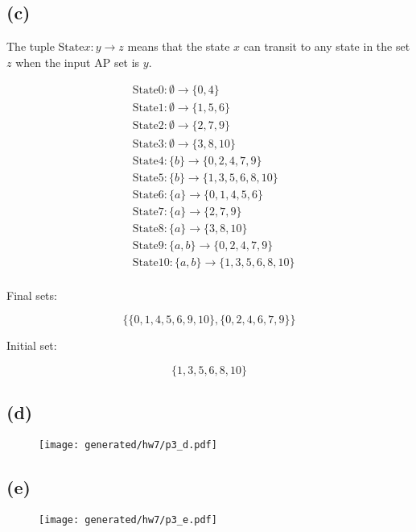 \subsection*{(c)}

The tuple $\text{State} x: y \rightarrow z$ means that the state $x$ can transit to any state in the set $z$ when the input AP set is $y$.

$$
\begin{aligned}
& \text{State} 0: \emptyset \to \{ 0, 4 \} \\
& \text{State} 1: \emptyset \to \{ 1, 5, 6 \} \\
& \text{State} 2: \emptyset \to \{ 2, 7, 9 \} \\
& \text{State} 3: \emptyset \to \{ 3, 8, 10 \} \\
& \text{State} 4: \{ b \} \to \{ 0, 2, 4, 7, 9 \} \\
& \text{State} 5: \{ b \} \to \{ 1, 3, 5, 6, 8, 10 \} \\
& \text{State} 6: \{ a \} \to \{ 0, 1, 4, 5, 6 \} \\
& \text{State} 7: \{ a \} \to \{ 2, 7, 9 \} \\
& \text{State} 8: \{ a \} \to \{ 3, 8, 10 \} \\
& \text{State} 9: \{ a, b \} \to \{ 0, 2, 4, 7, 9 \} \\
& \text{State} 10: \{ a,b \} \to \{ 1, 3, 5, 6, 8, 10 \} \\
\end{aligned}
$$

Final sets:

$$
\{\{ 0, 1, 4, 5, 6, 9, 10 \}, \{ 0, 2, 4, 6, 7, 9 \} \}
$$

Initial set:

$$
\{ 1, 3, 5, 6, 8, 10 \}
$$

\subsection*{(d)}

\begin{figure}[H]
    \centering
    \texttt{[image: generated/hw7/p3\_d.pdf]}
\end{figure}

\subsection*{(e)}

\begin{figure}[H]
    \centering
    \texttt{[image: generated/hw7/p3\_e.pdf]}
\end{figure}


